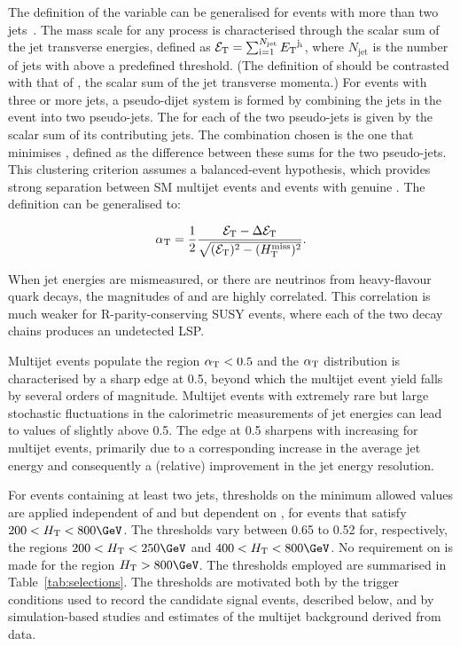 The definition of the \alphat variable can be generalised for events
with more than two jets~\cite{RA1Paper}. The mass scale for any
process is characterised through the scalar sum of the jet transverse
energies, defined as $\mathcal{E}_\mathrm{T} = \sum_{\textrm{i}=1}^{N_\text{jet}}
{E_{\text T}}^{\mathrm{j_i}}$, where $N_\text{jet}$ is the number of jets with
\Et above a predefined threshold. (The definition of \scalst should be
contrasted with that of \scalht, the scalar sum of the jet transverse
momenta.)
For events with three or more jets, a pseudo-dijet system is formed by
combining the jets in the event into two pseudo-jets. The \scalst for
each of the two pseudo-jets is given by the scalar \Et sum of its
contributing jets. The combination chosen is the one that minimises
\dst, defined as the difference between these sums for the two
pseudo-jets.  This clustering criterion assumes a balanced-event
hypothesis, which provides strong separation between SM multijet
events and events with genuine \ptvecmiss. The \alphat definition can
be generalised to:

\begin{equation}
  \label{eq:alphat}
  \alpha_{\text{T}} = \frac{1}{2} \frac{\mathcal{E}_\mathrm{T} -
    \Delta\mathcal{E}_\mathrm{T}}{\sqrt{(\mathcal{E}_\mathrm{T})^2 - (H_{\text{T}}^{\text{miss}})^2}}.
\end{equation}

When jet energies are mismeasured, or there are neutrinos from
heavy-flavour quark decays, the magnitudes of \HTmiss and \dst are
highly correlated. This correlation is much weaker for
R-parity-conserving SUSY events, where each of the two decay chains
produces an undetected LSP.

Multijet events populate the region $\alpha_{\text{T}}< 0.5$ and the $\alpha_{\text{T}}$
distribution is characterised by a sharp edge at 0.5, beyond which the
multijet event yield falls by several orders of magnitude. Multijet
events with extremely rare but large stochastic fluctuations in the
calorimetric measurements of jet energies can lead to values of
\alphat slightly above 0.5. The edge at 0.5 sharpens with increasing
\scalht for multijet events, primarily due to a corresponding increase
in the average jet energy and consequently a (relative) improvement in
the jet energy resolution.

For events containing at least two jets, thresholds on the minimum
allowed \alphat values are applied independent of \njet and \nb but
dependent on \scalht, for events that satisfy $200 < \scalht <
800\GeV$. The \alphat thresholds vary between 0.65 to 0.52 for,
respectively, the regions $200 < \scalht < 250\GeV$ and $400 < \scalht
< 800\GeV$. No requirement on \alphat is made for the region $\scalht
> 800\GeV$. The thresholds employed are summarised in
Table~\ref{tab:selections}. The \alphat thresholds are motivated both
by the trigger conditions used to record the candidate signal events,
described below, and by simulation-based studies and estimates of the
multijet background derived from data. 

